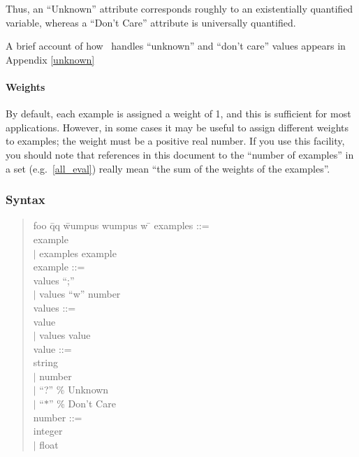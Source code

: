 Thus, an ``Unknown'' attribute corresponds roughly to
an existentially quantified variable,
whereas a ``Don't Care'' attribute is universally quantified.

A brief account of how \ID\ handles ``unknown'' and ``don't care''
values appears in Appendix \ref{unknown}

\paragraph{Weights}
By default, each example is assigned a weight of 1, and this is
sufficient for most applications.  However, in some
cases it may be useful to assign different weights to examples; the 
weight must be a positive real number.  If you use this facility, you
should note that references in this document to the ``number of
examples'' in a set (e.g.\ \ref{all_eval}) really mean ``the sum of the weights
of the examples''.


\subsubsection{Syntax}

\begin{quotation} \sf
\begin{tabbing}
foo \= qq \= wumpus  wumpus w \= \kill
examples ::= \\
\>\>  example \\
\> $\mid$ \> examples \gap example  \\[2.5ex]
example ::= \\
\>\>   values ``;''  \\
\>$\mid$ \>values ``w'' number \\[2.5ex]
values ::=  \\
\>\>   value  \\
\>$\mid$ \>values \gap value \\[2.5ex]
value ::=    \\
\>\>string   \\
\>$\mid$ \> number  \\
\>$\mid$ \> ``?''  \> \rm \% Unknown \\
\>$\mid$ \> ``$\ast$'' \> \rm \% Don't Care \\[2.5ex]
number ::= \\
\>\> integer \\
\>$\mid$ \> float \\
\end{tabbing}
\end{quotation}

